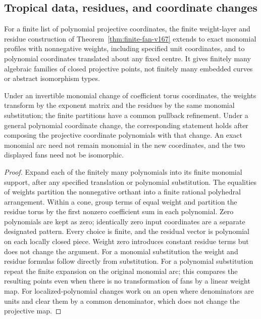 \subsection{Tropical data, residues, and coordinate changes}
\begin{proposition}
\label{prop:fan-comparison-v169}
For a finite list of polynomial projective coordinates, the finite
weight-layer and residue construction of
Theorem~\ref{thm:finite-fan-v167} extends to exact monomial profiles
with nonnegative weights, including specified unit coordinates, and
to polynomial coordinates translated about any fixed centre. It gives
finitely many algebraic families of closed projective points, not
finitely many embedded curves or abstract isomorphism types.

Under an invertible monomial change of coefficient torus coordinates,
the weights transform by the exponent matrix and the residues by the
same monomial substitution; the finite partitions have a common
pullback refinement. Under a general polynomial coordinate change,
the corresponding statement holds after composing the projective
coordinate polynomials with that change. An exact monomial arc need
not remain monomial in the new coordinates, and the two displayed
fans need not be isomorphic.
\end{proposition}
\begin{proof}
Expand each of the finitely many polynomials into its finite monomial
support, after any specified translation or polynomial substitution.
The equalities of weights partition the nonnegative orthant into a
finite rational polyhedral arrangement. Within a cone, group terms
of equal weight and partition the residue torus by the first nonzero
coefficient sum in each polynomial. Zero polynomials are kept as zero;
identically zero input coordinates are a separate designated pattern.
Every choice is finite, and the residual vector is polynomial on each
locally closed piece. Weight zero introduces constant residue terms
but does not change the argument. For a monomial substitution the
weight and residue formulas follow directly from substitution.
For a polynomial substitution repeat the finite expansion on the
original monomial arc; this compares the resulting points even when
there is no transformation of fans by a linear weight map. For
localized-polynomial changes work on an open where denominators are
units and clear them by a common denominator, which does not change
the projective map.
\end{proof}

